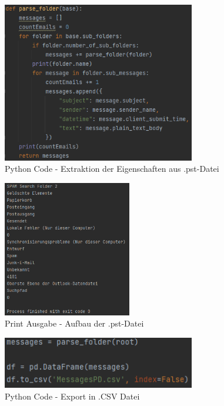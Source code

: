 \begin{figure}
    \centering
    \includegraphics[width=0.75\textwidth]{images/Extraktion_aus_Pst_file.PNG}
    \caption{Python Code - Extraktion der Eigenschaften aus .pst-Datei} 
    \label{fig:extraction}
\end{figure}

\begin{figure}
    \centering
    \includegraphics[width=0.50\textwidth]{images/PST_File_Aufbau_Python.png}
    \caption{Print Ausgabe - Aufbau der .pst-Datei} 
    \label{fig:pstfileaufbau}
\end{figure}

\begin{figure}
    \centering
    \includegraphics[width=0.75\textwidth]{images/Dataframe_messages.PNG}
    \caption{Python Code - Export in .CSV Datei} 
    \label{fig:dataframeparstetocsv}
\end{figure}

